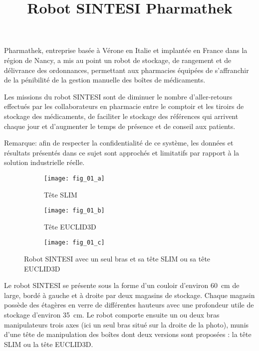 \title{Robot SINTESI Pharmathek }
\maketitle

Pharmathek, entreprise basée à Vérone en Italie et implantée en France dans la région de Nancy, a mis au point un robot de stockage, de rangement et de délivrance des ordonnances, permettant aux pharmacies équipées de s'affranchir de la pénibilité de la gestion manuelle des boîtes de médicaments.

Les missions du robot SINTESI sont de diminuer le nombre d'aller-retours effectués par les collaborateurs en pharmacie entre le comptoir et les tiroirs de stockage des médicaments, de faciliter le stockage des références qui arrivent chaque jour et d'augmenter le temps de présence et de conseil aux patients.

Remarque: afin de respecter la confidentialité de ce système, les données et résultats présentés dans ce sujet sont approchés et limitatifs par rapport à la solution industrielle réelle.
\begin{figure}
	\centering
    \begin{subfigure}[b]{0.3\textwidth}
    \centering
    \texttt{[image: fig\_01\_a]}
    \caption{Tête SLIM\label{fig:CCS_TSI_2021_fig_01_a}}
    \end{subfigure}
    \begin{subfigure}[b]{0.65\textwidth}
    \centering
    \texttt{[image: fig\_01\_b]}
    \caption{Tête EUCLID3D\label{fig:image2}}
    \end{subfigure}

    \begin{subfigure}[b]{.9\textwidth}
    \centering
    \texttt{[image: fig\_01\_c]}
    \end{subfigure}

\caption{Robot SINTESI avec un seul bras et sa tête SLIM ou sa tête EUCLID3D \label{fig:CCS_TSI_2021_fig_01}}%
\end{figure}


Le robot SINTESI se présente sous la forme d'un couloir d'environ \SI{60}{cm} de large, bordé à gauche et à droite par deux magasins de stockage. Chaque magasin possède des étagères en verre de différentes hauteurs avec une profondeur utile de stockage d'environ \SI{35}{cm}. Le robot comporte ensuite un ou deux bras manipulateurs trois axes (ici un seul bras situé sur la droite de la photo), munis d'une tête de manipulation des boîtes dont deux versions sont proposées : la tête SLIM ou la tête EUCLID3D.

